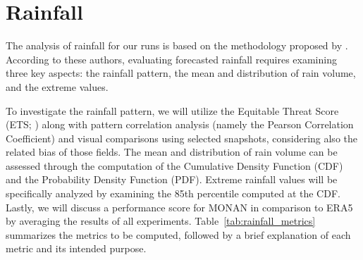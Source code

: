 \section{Rainfall}

The analysis of rainfall for our runs is based on the methodology proposed by . According to these authors, evaluating forecasted rainfall requires examining three key aspects: the rainfall pattern, the mean and distribution of rain volume, and the extreme values.


To investigate the rainfall pattern, we will utilize the Equitable Threat Score (ETS; ) along with pattern correlation analysis (namely the Pearson Correlation Coefficient) and visual comparisons using selected snapshots, considering also the related bias of those fields. The mean and distribution of rain volume can be assessed through the computation of the Cumulative Density Function (CDF) and the Probability Density Function (PDF). Extreme rainfall values will be specifically analyzed by examining the 85th percentile computed at the CDF. Lastly, we will discuss a performance score for MONAN in comparison to ERA5 by averaging the results of all experiments. Table~\ref{tab:rainfall_metrics} summarizes the metrics to be computed, followed by a brief explanation of each metric and its intended purpose.

